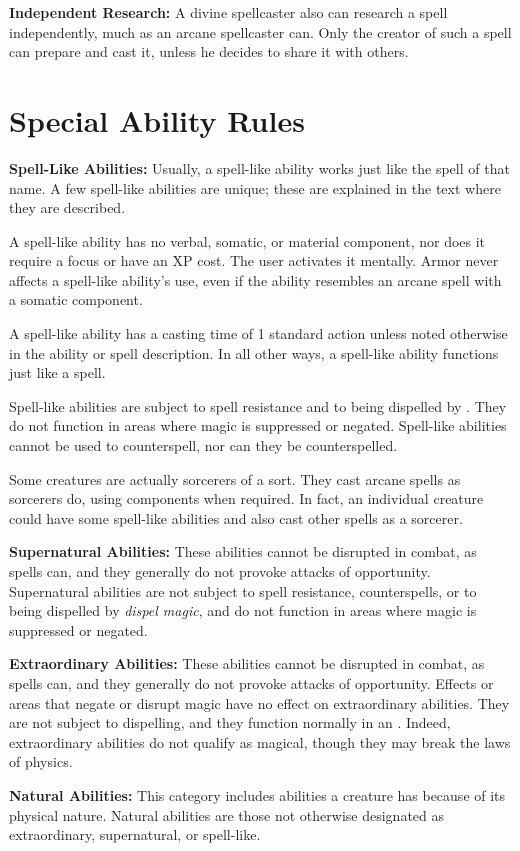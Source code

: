 \textbf{Independent Research:} A divine spellcaster also can research a spell independently, 
much as an arcane spellcaster can. Only the creator of such a spell can prepare 
and cast it, unless he decides to share it with others.

\section{Special Ability Rules}

\textbf{Spell-Like Abilities:} Usually, a spell-like ability works just like the 
spell of that name. A few spell-like abilities are unique; these are explained 
in the text where they are described.

A spell-like ability has no verbal, somatic, or material component, nor does it 
require a focus or have an XP cost. The user activates it mentally. Armor never 
affects a spell-like ability's use, even if the ability resembles an arcane spell 
with a somatic component.

A spell-like ability has a casting time of 1 standard action unless noted otherwise 
in the ability or spell description. In all other ways, a spell-like ability functions 
just like a spell.

Spell-like abilities are subject to spell resistance and to being dispelled by 
. They do not function in areas where magic is suppressed 
or negated. Spell-like abilities cannot be used to counterspell, nor can they be 
counterspelled.

Some creatures are actually sorcerers of a sort. They cast arcane spells as sorcerers 
do, using components when required. In fact, an individual creature could have 
some spell-like abilities and also cast other spells as a sorcerer.

\textbf{Supernatural Abilities:} These abilities cannot be disrupted in combat, 
as spells can, and they generally do not provoke attacks of opportunity. Supernatural 
abilities are not subject to spell resistance, counterspells, or to being dispelled 
by \textit{dispel magic}, and do not function in areas where magic is suppressed 
or negated.

\textbf{Extraordinary Abilities:} These abilities cannot be disrupted in combat, 
as spells can, and they generally do not provoke attacks of opportunity. Effects 
or areas that negate or disrupt magic have no effect on extraordinary abilities. 
They are not subject to dispelling, and they function normally in an .
Indeed, extraordinary abilities do not qualify as magical, though they 
may break the laws of physics.

\textbf{Natural Abilities:} This category includes abilities a creature has because 
of its physical nature. Natural abilities are those not otherwise designated as 
extraordinary, supernatural, or spell-like.
